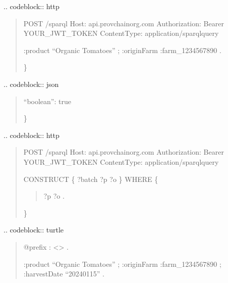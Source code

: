 \documentclass[letterpaper,10pt,english]{sphinxmanual}
\begin{document}
\sphinxAtStartPar
{}
.. code\sphinxhyphen{}block:: http
\begin{quote}

\sphinxAtStartPar
POST /sparql
Host: api.provchain\sphinxhyphen{}org.com
Authorization: Bearer YOUR\_JWT\_TOKEN
Content\sphinxhyphen{}Type: application/sparql\sphinxhyphen{}query
\begin{description}
\begin{description}
\sphinxAtStartPar
:product “Organic Tomatoes” ;
:originFarm :farm\_1234567890 .

\end{description}

\end{description}

\sphinxAtStartPar
\}
\end{quote}

\sphinxAtStartPar
{}
.. code\sphinxhyphen{}block:: json
\begin{quote}
\begin{description}
\sphinxlineitem{\{}
\sphinxAtStartPar
“boolean”: true

\end{description}

\sphinxAtStartPar
\}
\end{quote}

\sphinxAtStartPar
{}
.. code\sphinxhyphen{}block:: http
\begin{quote}

\sphinxAtStartPar
POST /sparql
Host: api.provchain\sphinxhyphen{}org.com
Authorization: Bearer YOUR\_JWT\_TOKEN
Content\sphinxhyphen{}Type: application/sparql\sphinxhyphen{}query

\sphinxAtStartPar
CONSTRUCT \{ ?batch ?p ?o \}
WHERE \{
\begin{quote}
\begin{description}
\sphinxAtStartPar
?p ?o .

\end{description}
\end{quote}

\sphinxAtStartPar
\}
\end{quote}

\sphinxAtStartPar
{}
.. code\sphinxhyphen{}block:: turtle
\begin{quote}

\sphinxAtStartPar
@prefix : \textless{}\textgreater{} .
\begin{description}
\sphinxAtStartPar
:product “Organic Tomatoes” ;
:originFarm :farm\_1234567890 ;
:harvestDate “2024\sphinxhyphen{}01\sphinxhyphen{}15” .

\end{description}
\end{quote}
\end{document}
